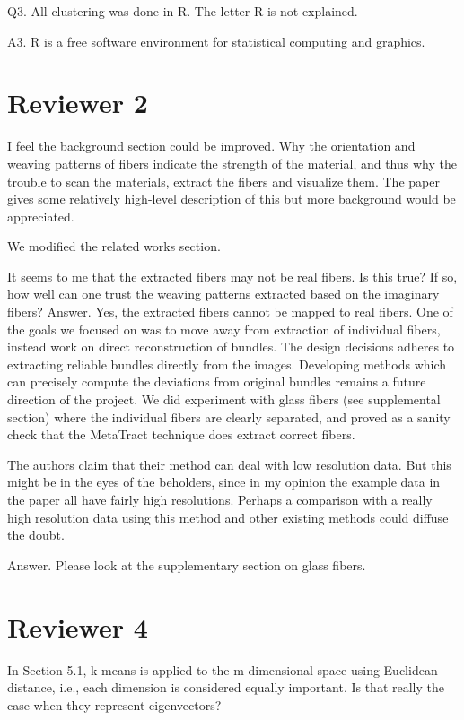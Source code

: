 \documentclass[]{article}
\begin{document}
  

\color{red}
Q3. All clustering was done in R. The letter R is not explained.
\color{black}

A3. R is a free software environment for statistical computing and graphics.

\section{Reviewer 2}
\color{red}
I feel the background section could be improved. Why the orientation and weaving patterns of fibers indicate the strength of the material, and thus why the trouble to scan the materials, extract the fibers and visualize them. The paper gives some relatively high-level description of this but more background would be appreciated.


\color{black}
We modified the related works section.

\color{red}
  It seems to me that the extracted fibers may not be real fibers. Is this
  true? If so, how well can one trust the weaving patterns extracted based
  on the imaginary fibers? 
  \color{black}
  Answer. 
Yes, the extracted fibers cannot be mapped to real fibers. One of the goals  we  focused on was to move away from extraction of individual fibers, instead work on direct reconstruction of bundles. The design decisions adheres to extracting reliable bundles directly from the images. 
 Developing methods which can precisely compute the deviations from original bundles remains a future direction of the project. We did experiment with glass fibers (see supplemental section) where the individual fibers are clearly separated, and proved as a sanity check that the MetaTract technique does extract correct fibers. 

\color{red}
The authors claim that their method can deal with low resolution data.
But this might be in the eyes of the beholders, since in my opinion the example data in the paper all have fairly high resolutions. Perhaps a comparison with a really high resolution data using this method and other existing methods could diffuse the doubt.
\color{black}

Answer.  Please look at the supplementary section on glass fibers.


\section{Reviewer 4}
\color{red}
In Section 5.1, k-means is applied to the m-dimensional space using
Euclidean distance, i.e., each dimension is considered equally important.
Is that really the case when they represent eigenvectors?
\end{document}
